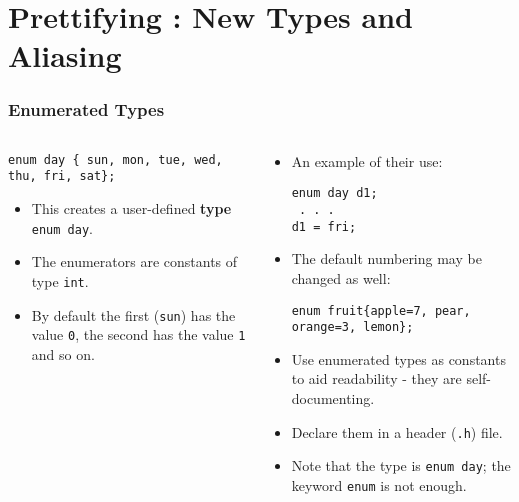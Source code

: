 \section{Prettifying : New Types and Aliasing}

\begin{frame}[fragile]
\frametitle{Enumerated Types}
\begin{columns}
\begin{column}{0.45\textwidth}
{\small
\begin{verbatim}
enum day { sun, mon, tue, wed, thu, fri, sat};
\end{verbatim}
}

\begin{itemize}[<+->]
\item This creates a user-defined {\bf type} \verb^enum day^.
\item The enumerators are constants of type \verb^int^.
\item By default the first (\verb^sun^) has the value \verb^0^,
the second has the value \verb^1^ and so on.
\end{itemize}
\end{column}

\begin{column}{0.45\textwidth}
\begin{itemize}[<+->]
\item An example of their use:
\begin{verbatim}
enum day d1;
 . . .
d1 = fri;
\end{verbatim}
\item The default numbering may be changed as well:
{\small
\begin{verbatim}
enum fruit{apple=7, pear, orange=3, lemon};
\end{verbatim}
}
\item Use enumerated types as constants to aid readability -
they are self-documenting.
\item Declare them in a header (\verb^.h^) file.
\item Note that the type is \verb^enum day^; the
keyword \verb^enum^ is not enough.
\end{itemize}
\end{column}


\end{columns}
\end{frame}


